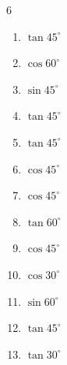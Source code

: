 \begin{multicols}{6}
\begin{enumerate}
  \item $\displaystyle \tan{45^\circ}$

        \phantom{$\displaystyle =1$}

  \item $\displaystyle \cos{60^\circ}$


  \item $\displaystyle \sin{45^\circ}$


  \item $\displaystyle \tan{45^\circ}$

        \phantom{$\displaystyle =1$}

  \item $\displaystyle \tan{45^\circ}$

        \phantom{$\displaystyle =1$}

  \item $\displaystyle \cos{45^\circ}$


  \item $\displaystyle \cos{45^\circ}$


  \item $\displaystyle \tan{60^\circ}$


  \item $\displaystyle \cos{45^\circ}$


  \item $\displaystyle \cos{30^\circ}$


  \item $\displaystyle \sin{60^\circ}$


\columnbreak %

  \item $\displaystyle \tan{45^\circ}$

        \phantom{$\displaystyle =1$}

  \item $\displaystyle \tan{30^\circ}$


\end{enumerate}
\end{multicols}
